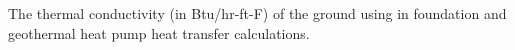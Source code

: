 The thermal conductivity (in Btu/hr-ft-F) of the ground using in foundation and geothermal heat pump heat transfer calculations.
